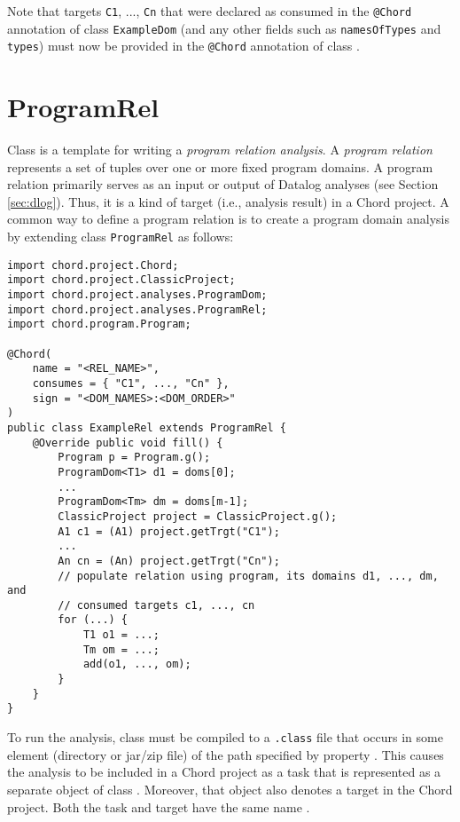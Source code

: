 Note that targets {\tt C1}, ..., {\tt Cn} that were declared as consumed in
the {\tt @Chord} annotation of class {\tt ExampleDom} (and any other fields
such as {\tt namesOfTypes} and {\tt types}) must now be provided in the
{\tt @Chord} annotation of class .

\section{ProgramRel}
\label{sec:program-rel}

Class 
is a template for writing a {\it program relation analysis}.
A {\it program relation} represents a set of tuples over one or more fixed 
program domains.  A program relation primarily serves as an input or output of
Datalog analyses (see Section \ref{sec:dlog}).  Thus, it is a kind of
target (i.e., analysis result) in a Chord project.  A common way to define a
program relation is to create a program domain analysis by extending class
{\tt ProgramRel} as follows:

\begin{framed}
\begin{verbatim}
import chord.project.Chord;
import chord.project.ClassicProject;
import chord.project.analyses.ProgramDom;
import chord.project.analyses.ProgramRel;
import chord.program.Program;

@Chord(
    name = "<REL_NAME>",
    consumes = { "C1", ..., "Cn" },
    sign = "<DOM_NAMES>:<DOM_ORDER>"
)
public class ExampleRel extends ProgramRel {
    @Override public void fill() {
        Program p = Program.g();
        ProgramDom<T1> d1 = doms[0];
        ...
        ProgramDom<Tm> dm = doms[m-1];
        ClassicProject project = ClassicProject.g();
        A1 c1 = (A1) project.getTrgt("C1");
        ...
        An cn = (An) project.getTrgt("Cn");
        // populate relation using program, its domains d1, ..., dm, and
        // consumed targets c1, ..., cn
        for (...) {
            T1 o1 = ...;
            Tm om = ...;
            add(o1, ..., om); 
        }
    }
}
\end{verbatim}
\end{framed}

To run the analysis, class  must be compiled to a {\tt .class}
file that occurs in some element (directory or jar/zip file) of the path
specified by property .  This causes the
analysis to be included in a Chord project as a task that is represented as a
separate object of class .  Moreover, that object also denotes
a target in the Chord project.  Both the task and target have the same name
.

